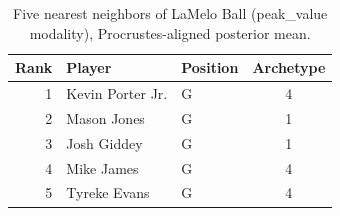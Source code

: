 \begin{table}[htbp]
  \centering\small
  \begin{tabular}{rllc}
    \toprule
    Rank & Player & Position & Archetype \\
    \midrule
    1 & Kevin Porter Jr. & G & 4 \\
    2 & Mason Jones & G & 1 \\
    3 & Josh Giddey & G & 1 \\
    4 & Mike James & G & 4 \\
    5 & Tyreke Evans & G & 4 \\
    \bottomrule
  \end{tabular}
  \caption{Five nearest neighbors of LaMelo Ball (peak_value modality), Procrustes-aligned posterior mean.}
  \label{tab:LaMelo_Ball_neighbors_peak_value}
\end{table}

